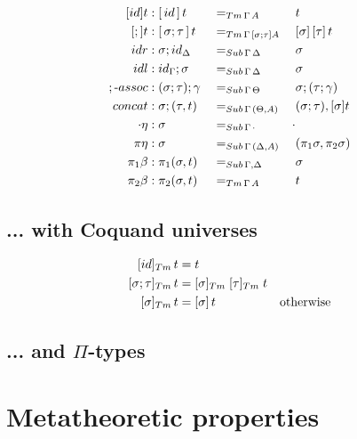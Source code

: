 \documentclass[a4paper,UKenglish,numberwithinsect,cleveref,thm-restate]{lipics-v2021}
\begin{document}
\begin{alignat*}{3}
  [\idS]t         & : {[\,\idS\,]\,t}          && =_{\Tm\,\Gamma\,A} && t \\
  [;]t            & : {[\,\sigma ; \tau\,]\,t} && =_{\Tm\,\Gamma\,[\sigma ; \tau] A} && {[ \sigma ]\,[ \tau ]\,t} \\
  \mathsf{idr}    & : {\sigma ; \idS_{\Delta}} && =_{\Sub\,\Gamma\,\Delta} && {\sigma} \\
  \mathsf{idl}    & : {\idS_{\Gamma} ; \sigma} && =_{\Sub\,\Gamma\,\Delta} && {\sigma} \\
  ;\text{-}\mathsf{assoc} & : (\sigma ; \tau) ; \gamma && =_{\Sub\,\Gamma\,\Theta} &&  \sigma ; (\tau ; \gamma) \\
  \mathsf{concat} & : \sigma ; (\tau , t)      && =_{\Sub\,\Gamma\,(\Theta, A)} &&  (\sigma ; \tau) , [ \sigma ] t \\
  \emptyctx\eta   & : \sigma                   && =_{\Sub\,\Gamma\,\emptyctx} & \emptysub \\
  \pi\eta         & : \sigma                   && =_{\Sub\,\Gamma\,(\Delta, A)} &&  (\pi_1 \sigma, \pi_2 \sigma) \\
  \pi_1\beta      & : \pi_1(\sigma , t)        && =_{\Sub\,\Gamma,\Delta} &&  \sigma \\
  \pi_2\beta      & : \pi_2(\sigma , t)        && =_{\Tm\,\Gamma\, A} &&  t
\end{alignat*}

\subsection{... with Coquand universes} \label{subsec:SC+U}
\cite{Coquand2013}
\begin{alignat*}{3}
[ \idS ]_{\Tm}\,t          & = t \\
[ \sigma ; \tau ]_{\Tm}\,t & = [ \sigma ]_{\Tm}\;[ \tau ]_{\Tm}\;t \\
[ \sigma ]_{\Tm}\,t        & = [ \sigma ]\,t & \text{otherwise}  \\
\end{alignat*}
\subsection{... and \texorpdfstring{$\Pi$}{Π}-types} \label{subsec:SC+U+Pi}

\section{Metatheoretic properties}
\end{document}
